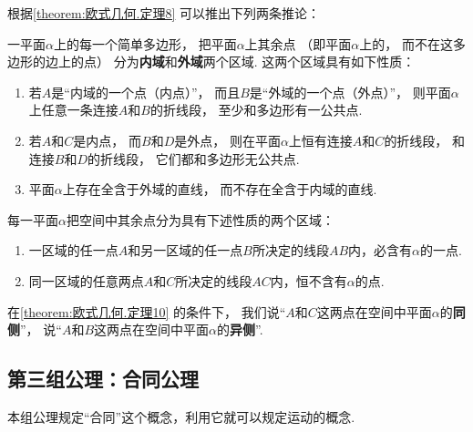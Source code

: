根据\cref{theorem:欧式几何.定理8} 可以推出下列两条推论：
\begin{theorem}\label{theorem:欧式几何.定理9}
一平面\(\alpha\)上的每一个简单多边形，%
把平面\(\alpha\)上其余点%
（即平面\(\alpha\)上的，%
而不在这多边形的边上的点）%
分为\textbf{内域}和\textbf{外域}两个区域.
这两个区域具有如下性质：
\begin{enumerate}
	\item 若\(A\)是“内域的一个点（内点）”，%
	而且\(B\)是“外域的一个点（外点）”，%
	则平面\(\alpha\)上任意一条连接\(A\)和\(B\)的折线段，%
	至少和多边形有一公共点.

	\item 若\(A\)和\(C\)是内点，%
	而\(B\)和\(D\)是外点，%
	则在平面\(\alpha\)上恒有连接\(A\)和\(C\)的折线段，%
	和连接\(B\)和\(D\)的折线段，%
	它们都和多边形无公共点.

	\item 平面\(\alpha\)上存在全含于外域的直线，%
	而不存在全含于内域的直线.
\end{enumerate}
\end{theorem}

\begin{theorem}\label{theorem:欧式几何.定理10}
每一平面\(\alpha\)把空间中其余点分为具有下述性质的两个区域：
\begin{enumerate}
	\item 一区域的任一点\(A\)和另一区域的任一点\(B\)所决定的线段\(AB\)内，必含有\(\alpha\)的一点.
	\item 同一区域的任意两点\(A\)和\(C\)所决定的线段\(AC\)内，恒不含有\(\alpha\)的点.
\end{enumerate}
\end{theorem}

\begin{definition}
在\cref{theorem:欧式几何.定理10} 的条件下，%
我们说“\(A\)和\(C\)这两点在空间中平面\(\alpha\)的\textbf{同侧}”，%
说“\(A\)和\(B\)这两点在空间中平面\(\alpha\)的\textbf{异侧}”.
\end{definition}

\subsection{第三组公理：合同公理}
本组公理规定“合同”这个概念，利用它就可以规定运动的概念.

